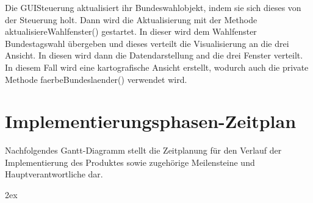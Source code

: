 \documentclass[12pt,a4paper,titlepage]{article}
\begin{document}
Die GUISteuerung aktualisiert ihr Bundeswahlobjekt, indem sie sich dieses von der Steuerung holt. Dann wird die Aktualisierung mit der Methode aktualisiereWahlfenster() gestartet. In dieser wird dem Wahlfenster Bundestagswahl übergeben und dieses verteilt die Visualisierung an die drei Ansicht. In diesen wird dann die Datendarstellung and die drei Fenster verteilt. In diesem Fall wird eine kartografische Ansicht erstellt, wodurch auch die private Methode faerbeBundeslaender() verwendet wird.
\newpage
\section{Implementierungsphasen-Zeitplan}
Nachfolgendes Gantt-Diagramm stellt die Zeitplanung für den Verlauf der Implementierung des Produktes sowie zugehörige Meilensteine und Hauptverantwortliche dar.


\begingroup
\parindent 0pt
\parskip 2ex
\def\enotesize{\normalsize}

\endgroup
\end{document}

